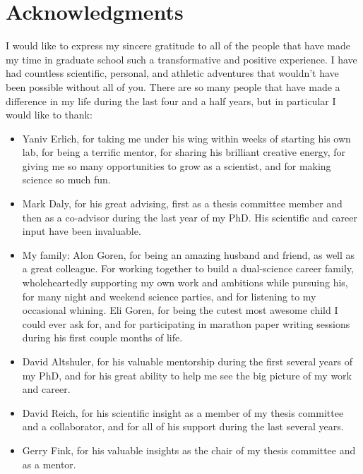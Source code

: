 \section*{Acknowledgments}

I would like to express my sincere gratitude to all of the people that have made my time in graduate school such a transformative and positive experience. I have had countless scientific, personal, and athletic adventures that wouldn't have been possible without all of you. There are so many people that have made a difference in my life during the last four and a half years, but in particular I would like to thank: 

\begin{itemize}

\item Yaniv Erlich, for taking me under his wing within weeks of starting his own lab, for being a terrific mentor, for sharing his brilliant creative energy, for giving me so many opportunities to grow as a scientist, and for making science so much fun.

\item Mark Daly, for his great advising, first as a thesis committee member and then as a co-advisor during the last year of my PhD. His scientific and career input have been invaluable.

\item My family: Alon Goren, for being an amazing husband and friend, as well as a great colleague. For working together to build a dual-science career family, wholeheartedly supporting my own work and ambitions while pursuing his, for many night and weekend science parties, and for listening to my occasional whining. Eli Goren, for being the cutest most awesome child I could ever ask for, and for participating in marathon paper writing sessions during his first couple months of life.

\item David Altshuler, for his valuable mentorship during the first several years of my PhD, and for his great ability to help me see the big picture of my work and career.

\item David Reich, for his scientific insight as a member of my thesis committee and a collaborator, and for all of his support during the last several years.

\item Gerry Fink, for his valuable insights as the chair of my thesis committee and as a mentor.


\end{itemize}
